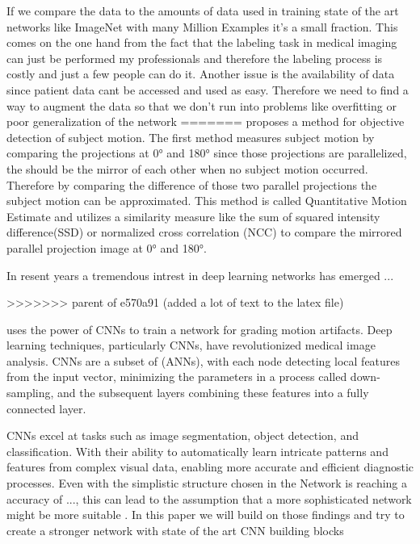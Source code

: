 \documentclass[
a4paper, 
12pt,
grayscalebody, %
abstract=on,
twoside, BCOR10mm, 12pt, DIV13,headinclude, footexclude, final, abstracton, openright
]{ibireprt}
\numberwithin{equation}{chapter}
\numberwithin{table}{chapter}
\numberwithin{figure}{chapter}
\numberwithin{algorithm}{chapter}
\numberwithin{example}{chapter}
\numberwithin{example}{chapter}
\begin{document}
 If we compare the data to the amounts of data used in training state of the art networks like ImageNet with many Million Examples it's a small fraction. This comes on the one hand from the fact that the labeling task in medical imaging can just be performed my professionals and therefore the labeling process is costly and just a few people can do it. Another issue is the availability of data since patient data cant be accessed and used as easy. Therefore we need to find a way to augment the data so that we don't run into problems like overfitting or poor generalization of the network 
=======
\cite{Walle2023} proposes a method for objective detection of subject motion. The first method measures subject motion by comparing the projections at 0° and 180° since those projections are parallelized, the should be the mirror of each other when no subject motion occurred. Therefore by comparing the difference of those two parallel projections the subject motion can be approximated. This method is called Quantitative Motion Estimate and utilizes a similarity measure like the sum of squared intensity difference(SSD) or normalized cross correlation (NCC) to compare the mirrored parallel projection image at 0° and 180°.

In resent years a tremendous intrest in deep learning networks has emerged \cite{LeCun2015} ...\cite{Yamashita2018} %
 
>>>>>>> parent of e570a91 (added a lot of text to the latex file)
  

\cite{Sode2011} uses the power of CNNs to train a network for grading motion artifacts. Deep learning techniques, particularly CNNs, have revolutionized medical image analysis. CNNs are a subset of (ANNs), with each node detecting local features from the input vector, minimizing the parameters in a process called down-sampling, and the subsequent layers combining these features into a fully connected layer.%

CNNs excel at tasks such as image segmentation, object detection, and classification. With their ability to automatically learn intricate patterns and features from complex visual data, enabling more accurate and efficient diagnostic processes. %
Even with the simplistic structure chosen in \cite{Sode2011} the Network is reaching a accuracy of ..., this can lead to the assumption that a more sophisticated network might be more suitable . In this paper we will build on those findings and try to create a stronger network with state of the art CNN building blocks 
\end{document}
